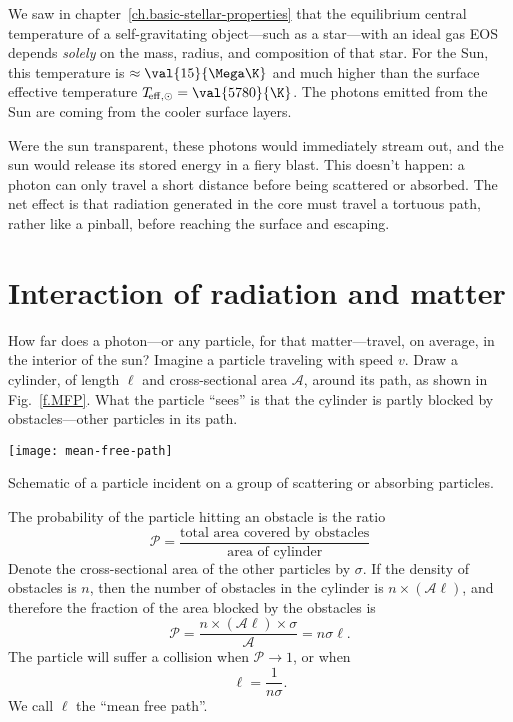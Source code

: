 
We saw in chapter~\ref{ch.basic-stellar-properties} that the equilibrium central temperature of a self-gravitating object---such as a star---with an ideal gas EOS depends \emph{solely} on the mass, radius, and composition of that star. For the Sun, this temperature is $\approx \val{15}{\Mega\K}$ and much higher than the surface effective temperature $T_{\!\mathrm{eff,\odot}} = \val{5780}{\K}$. The photons emitted from the Sun are coming from the cooler surface layers.

  Were the sun transparent, these photons would immediately stream out, and the sun would release its stored energy in a fiery blast.  This doesn't happen: a photon can only travel a short distance before being scattered or absorbed. The net effect is that radiation generated in the core must travel a tortuous path, rather like a pinball, before reaching the surface and escaping.

\section{Interaction of radiation and matter}\label{s.interaction-radiation-matter}

How far does a photon---or any particle, for that matter---travel, on average, in the interior of the sun? Imagine a particle traveling with speed $v$.  Draw a cylinder, of length $\ell$ and cross-sectional area $\mathcal{A}$, around its path, as shown in Fig.~\ref{f.MFP}. What the particle ``sees'' is that the cylinder is partly blocked by obstacles---other particles in its path.
\begin{marginfigure}
    \texttt{[image: mean-free-path]}
    \caption{\label{f.MFP} Schematic of a particle incident on a group of scattering or absorbing particles.}
\end{marginfigure}

 The probability of the particle hitting an obstacle is the ratio
\[
    \mathcal{P} = \frac{\textrm{total area covered by obstacles}}{\textrm{area of cylinder}}
\]
Denote the cross-sectional area of the other particles by $\sigma$. If the density of obstacles is $n$, then the number of obstacles in the cylinder is $n\times(\mathcal{A}\ell)$, and therefore the fraction of the area blocked by the obstacles is
\begin{equation}
    \mathcal{P} = \frac{n\times(\mathcal{A}\ell)\times\sigma}{\mathcal{A}} = n\sigma\ell.
\label{e.prob-MFP}
\end{equation}
The particle will suffer a collision when $\mathcal{P}\to 1$, or when
\begin{equation}\label{e.MFP}
    \ell = \frac{1}{n\sigma}.
\end{equation}
We call $\ell$ the ``mean free path''.


